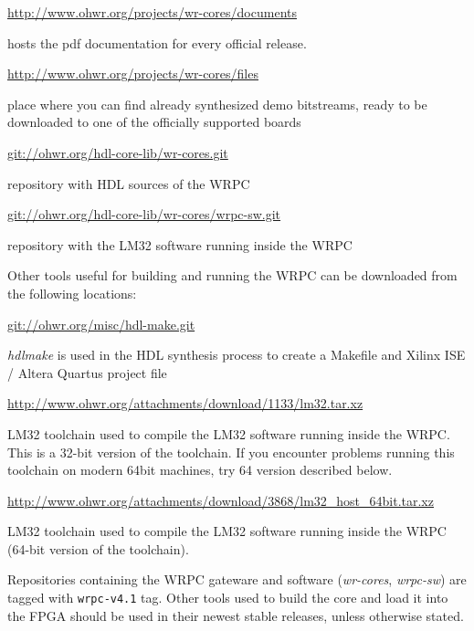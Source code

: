 \documentclass[a4paper, 12pt]{article}
\renewcommand{\_}{\underscore\allowbreak}
\begin{document}
\begin{itemize*}

\item \url{http://www.ohwr.org/projects/wr-cores/documents}

	hosts the pdf documentation for every official release.

\item \url{http://www.ohwr.org/projects/wr-cores/files}

	place where you can find already synthesized demo bitstreams, ready to be
  downloaded to one of the officially supported boards

\item \url{git://ohwr.org/hdl-core-lib/wr-cores.git}

	repository with HDL sources of the WRPC

\item \url{git://ohwr.org/hdl-core-lib/wr-cores/wrpc-sw.git}

  repository with the LM32 software running inside the WRPC

\end{itemize*}
Other tools useful for building and running the WRPC can be downloaded from the
following locations:

\begin{itemize*}

\item \url{git://ohwr.org/misc/hdl-make.git}

  \textit{hdlmake} is used in the HDL synthesis process to create a Makefile and
  Xilinx ISE / Altera Quartus project file

\item \url{http://www.ohwr.org/attachments/download/1133/lm32.tar.xz}

  LM32 toolchain used to compile the LM32 software running inside the WRPC.
  This is a 32-bit version of the toolchain. If you encounter problems running
  this toolchain on modern 64bit machines, try 64 version described below.

\item \url{http://www.ohwr.org/attachments/download/3868/lm32_host_64bit.tar.xz}

  LM32 toolchain used to compile the LM32 software running inside the WRPC
  (64-bit version of the toolchain).

  \end{itemize*}
Repositories containing the WRPC gateware and software (\textit{wr-cores},
\textit{wrpc-sw}) are tagged with \texttt{wrpc-v4.1} tag. Other tools used to
build the core and load it into the FPGA should be used in their newest stable
releases, unless otherwise stated.
\end{document}
